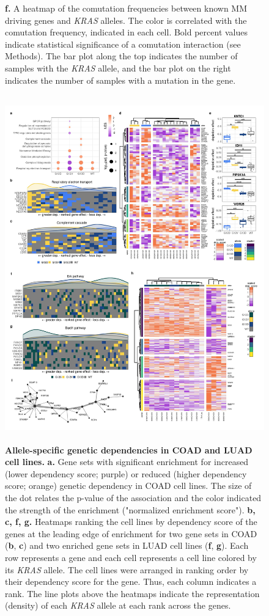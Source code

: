 \documentclass[english, 10pt, letterpaper]{article}
\newcommand{\KRAS}{\emph{KRAS}}
\begin{document}
\begin{figure}
{    \textbf{f.} A heatmap of the comutation frequencies between known MM driving genes and \KRAS{} alleles. The color is correlated with the comutation frequency, indicated in each cell. Bold percent values indicate statistical significance of a comutation interaction (see Methods). The bar plot along the top indicates the number of samples with the \KRAS{} allele, and the bar plot on the right indicates the number of samples with a mutation in the gene.
}
\label{fig:luadmm-comutation-main}
\end{figure}


\begin{figure}
\centering
\includegraphics[height=150mm]{figures/Figure_04.jpeg}
\caption{
    \textbf{Allele-specific genetic dependencies in COAD and LUAD cell lines.}
    \textbf{a.} Gene sets with significant enrichment for increased (lower dependency score; purple) or reduced (higher dependency score; orange) genetic dependency in COAD cell lines. The size of the dot relates the p-value of the association and the color indicated the strength of the enrichment ("normalized enrichment score").
    \textbf{b, c, f, g.} Heatmaps ranking the cell lines by dependency score of the genes at the leading edge of enrichment for two gene sets in COAD (\textbf{b}, \textbf{c}) and two enriched gene sets in LUAD cell lines (\textbf{f}, \textbf{g}). Each row represents a gene and each cell represents a cell line colored by its \KRAS{} allele. The cell lines were arranged in ranking order by their dependency score for the gene. Thus, each column indicates a rank. The line plots above the heatmaps indicate the representation (density) of each \KRAS{} allele at each rank across the genes.
}
\end{figure}
\end{document}
